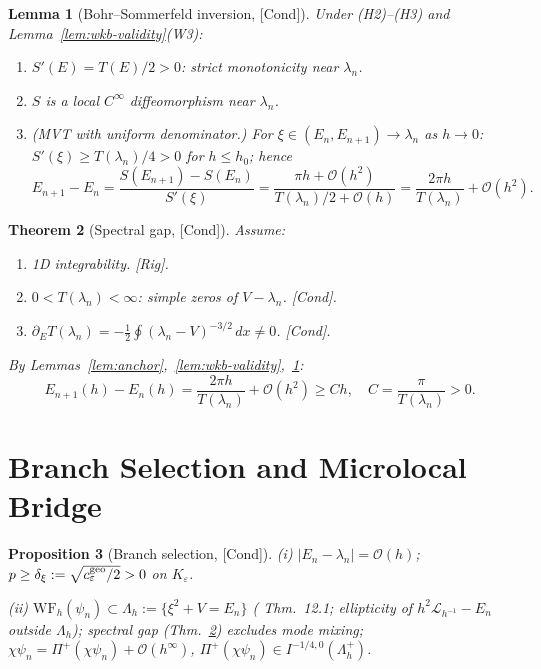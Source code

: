 \documentclass[12pt,a4paper]{amsart}
\newtheorem{theorem}{Theorem}[section]
\newtheorem{lemma}[theorem]{Lemma}
\newtheorem{proposition}[theorem]{Proposition}
\theoremstyle{definition}
\theoremstyle{remark}
\newcommand{\Rig}{\textup{[Rig]}}
\newcommand{\Cond}{\textup{[Cond]}}
\begin{document}
\begin{lemma}[Bohr--Sommerfeld inversion, \Cond]
\label{lem:bs-inversion}
Under (H2)--(H3) and Lemma~\ref{lem:wkb-validity}(W3):
\begin{enumerate}[{\rm(i)}]
\item $S'(E)=T(E)/2>0$: strict monotonicity near $\lambda_n$.
\item $S$ is a local $C^\infty$ diffeomorphism near $\lambda_n$.
\item \textit{(MVT with uniform denominator.)} For
  $\xi\in(E_n,E_{n+1})\to\lambda_n$ as $h\to 0$:
  $S'(\xi)\ge T(\lambda_n)/4>0$ for $h\le h_0$; hence
  \[
    E_{n+1}-E_n
    =\frac{S(E_{n+1})-S(E_n)}{S'(\xi)}
    =\frac{\pi h+\mathcal{O}(h^2)}{T(\lambda_n)/2+\mathcal{O}(h)}
    =\frac{2\pi h}{T(\lambda_n)}+\mathcal{O}(h^2).
  \]
\end{enumerate}
\end{lemma}

\begin{theorem}[Spectral gap, \Cond]
\label{thm:specgap}
Assume:
\begin{enumerate}[{\rm(H1)}]
\item 1D integrability. \Rig.
\item $0<T(\lambda_n)<\infty$: simple zeros of $V-\lambda_n$. \Cond.
\item $\partial_E T(\lambda_n)
  =-\tfrac12\oint(\lambda_n-V)^{-3/2}\,dx\ne 0$. \Cond.
\end{enumerate}
By Lemmas~\ref{lem:anchor},~\ref{lem:wkb-validity},~\ref{lem:bs-inversion}:
\begin{equation}\label{eq:specgap}
  E_{n+1}(h)-E_n(h)
  =\frac{2\pi h}{T(\lambda_n)}+\mathcal{O}(h^2)\ge Ch,
  \quad C=\frac{\pi}{T(\lambda_n)}>0.
\end{equation}
\end{theorem}

\section{Branch Selection and Microlocal Bridge}
\label{sec:branch}

\begin{proposition}[Branch selection, \Cond]
\label{prop:branch-selection}
\textit{(i)} $|E_n-\lambda_n|=\mathcal{O}(h)$;
$p\ge\delta_\xi:=\sqrt{c_\varepsilon^{\rm geo}/2}>0$ on $K_\varepsilon$.

\textit{(ii)} $\mathrm{WF}_h(\psi_n)\subset\Lambda_h:=\{\xi^2+V=E_n\}$
(\cite{Zworski2012} Thm.~12.1;
ellipticity of $h^2\mathcal{L}_{h^{-1}}-E_n$ outside $\Lambda_h$);
spectral gap (Thm.~\ref{thm:specgap}) excludes mode mixing;
$\chi\psi_n=\Pi^+(\chi\psi_n)+\mathcal{O}(h^\infty)$,
$\Pi^+(\chi\psi_n)\in I^{-1/4,0}(\Lambda_h^+)$.
\end{proposition}
\end{document}
